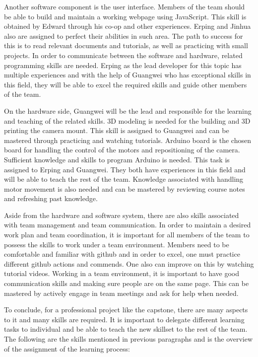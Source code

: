 \documentclass[12pt]{article}
\begin{document}
Another software component is the user interface. Members of the team should be able to build and maintain a working webpage using JavaScript. This skill is obtained by Edward through his co-op and other experiences. Erping and Jinhua also are assigned to perfect their abilities in such area. The path to success for this is to read relevant documents and tutorials, as well as practicing with small projects.
In order to communicate between the software and hardware, related programming skills are needed. Erping as the lead developer for this topic has multiple experiences and with the help of Guangwei who has exceptional skills in this field, they will be able to excel the required skills and guide other members of the team.  

On the hardware side, Guangwei will be the lead and responsible for the learning and teaching of the related skills. 3D modeling is needed for the building and 3D printing the camera mount. This skill is assigned to Guangwei and can be mastered through practicing and watching tutorials. Arduino board is the chosen board for handling the control of the motors and repositioning of the camera. Sufficient knowledge and skills to program Arduino is needed. This task is assigned to Erping and Guangwei. They both have experiences in this field and will be able to teach the rest of the team. Knowledge associated with handling motor movement is also needed and can be mastered by reviewing course notes and refreshing past knowledge. 

Aside from the hardware and software system, there are also skills associated with team management and team communication. In order to maintain a desired work plan and team coordination, it is important for all members of the team to possess the skills to work under a team environment. Members need to be comfortable and familiar with github and in order to excel, one must practice different github actions and commends. One also can improve on this by watching tutorial videos. Working in a team environment, it is important to have good communication skills and making sure people are on the same page. This can be mastered by actively engage in team meetings and ask for help when needed.  

To conclude, for a professional project like the capstone, there are many aspects to it and many skills are required. It is important to delegate different learning tasks to individual and be able to teach the new skillset to the rest of the team. The following are the skills mentioned in previous paragraphs and is the overview of the assignment of the learning process:
\end{document}
